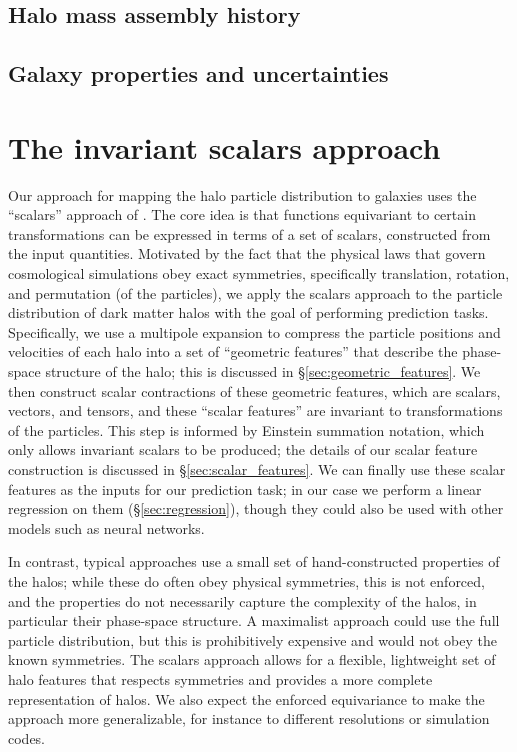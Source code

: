 \subsection{Halo mass assembly history}
\label{sec:mah}


\subsection{Galaxy properties and uncertainties}
\label{sec:galprops}




\section{The invariant scalars approach}
\label{sec:methods}

Our approach for mapping the halo particle distribution to galaxies uses the ``scalars'' approach of \cite{Villar2021a}.
The core idea is that functions equivariant to certain transformations can be expressed in terms of a set of scalars, constructed from the input quantities.  
Motivated by the fact that the physical laws that govern cosmological simulations obey exact symmetries, specifically translation, rotation, and permutation (of the particles), we apply the scalars approach to the particle distribution of dark matter halos with the goal of performing prediction tasks.
Specifically, we use a multipole expansion to compress the particle positions and velocities of each halo into a set of ``geometric features'' that describe the phase-space structure of the halo; this is discussed in \S\ref{sec:geometric_features}.
We then construct scalar contractions of these geometric features, which are scalars, vectors, and tensors, and these ``scalar features'' are invariant to transformations of the particles. 
This step is informed by Einstein summation notation, which only allows invariant scalars to be produced; the details of our scalar feature construction is discussed in \S\ref{sec:scalar_features}.
We can finally use these scalar features as the inputs for our prediction task; in our case we perform a linear regression on them (\S\ref{sec:regression}), though they could also be used with other models such as neural networks.

In contrast, typical approaches use a small set of hand-constructed properties of the halos; while these do often obey physical symmetries, this is not enforced, and the properties do not necessarily capture the complexity of the halos, in particular their phase-space structure.
A maximalist approach could use the full particle distribution, but this is prohibitively expensive and would not obey the known symmetries.
The scalars approach allows for a flexible, lightweight set of halo features that respects symmetries and provides a more complete representation of halos.
We also expect the enforced equivariance to make the approach more generalizable, for instance to different resolutions or simulation codes.


